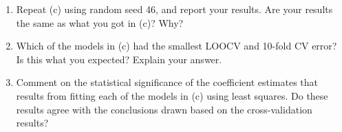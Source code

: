 \documentclass[]{article}
\providecommand{\tightlist}{%
  \setlength{\itemsep}{0pt}\setlength{\parskip}{0pt}}
\begin{document}
\begin{enumerate}
\def\labelenumi{(\alph{enumi})}
\setcounter{enumi}{3}
\tightlist
\item
  Repeat (c) using random seed 46, and report your results. Are your
  results the same as what you got in (c)? Why?
\item
  Which of the models in (c) had the smallest LOOCV and 10-fold CV
  error? Is this what you expected? Explain your answer.
\item
  Comment on the statistical significance of the coefficient estimates
  that results from fitting each of the models in (c) using least
  squares. Do these results agree with the conclusions drawn based on
  the cross-validation results?
\end{enumerate}
\end{document}

